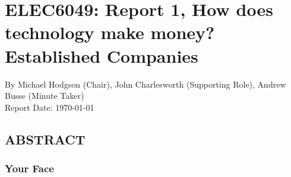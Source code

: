 \documentclass[11pt,a4paper]{article}
\begin{document}
\section{ ELEC6049: Report 1, How does technology make money? Established Companies }
\large{By Michael Hodgson (Chair), John Charlesworth (Supporting Role), Andrew Busse (Minute Taker)}
\\
Report Date: \today
\subsection{ABSTRACT}

\subsubsection{Your Face}
\end{document}
